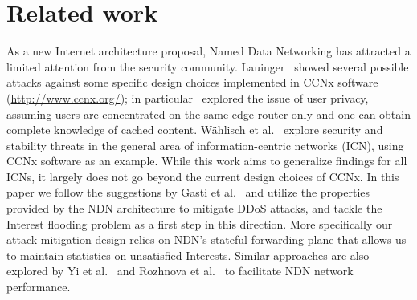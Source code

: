 \section{Related work}
\label{sec:related-work}

As a new Internet architecture proposal, Named Data Networking has attracted a limited attention from the security community. 
Lauinger~\cite{Lauinger:2010:Security--scalability} showed several possible attacks against some specific design choices implemented in CCNx software (\url{http://www.ccnx.org/}); in particular~\cite{Lauinger:2010:Security--scalability} explored the issue of user privacy, assuming users are concentrated on the same edge router only and one can obtain complete knowledge of cached content.  
W\"ahlisch et al.~\cite{Wahlisch:2012:Backscatter-from} explore security and stability threats in the general area of information-centric networks (ICN), using CCNx software as an example.  
While this work aims to generalize findings for all ICNs, it largely does not go beyond the current design choices of CCNx.
In this paper we follow the suggestions by Gasti et al.~\cite{gasti2012ddos} and utilize the properties provided by the NDN architecture to mitigate DDoS attacks, and tackle the Interest flooding problem as a first step in this direction.
More specifically our attack mitigation design relies on NDN's stateful forwarding plane that allows us to
maintain statistics on unsatisfied Interests.  
Similar approaches are also explored by Yi et al.~\cite{adaptive-forwarding,adaptive-tr,Yi:2013:A-Case-for-Stateful} and Rozhnova et al.~\cite{rozhnova2012effective} to facilitate NDN network performance.

